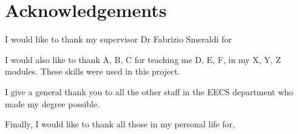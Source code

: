 \section*{\centering Acknowledgements}

I would like to thank my supervisor Dr Fabrizio Smeraldi for

I would also like to thank A, B, C for teaching me D, E, F, in my X, Y, Z modules. These skills were used in this project.

I give a general thank you to all the other staff in the EECS department who made my degree possible.

Finally, I would like to thank all those in my personal life for,


